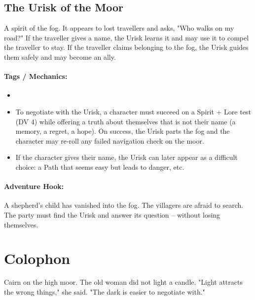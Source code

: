 \subsection*{The Urisk of the Moor}

A spirit of the fog. It appears to lost travellers and asks, "Who walks on my road?" If the traveller gives a name, the Urisk learns it and may use it to compel the traveller to stay. If the traveller claims belonging to the fog, the Urisk guides them safely and may become an ally.

\paragraph{Tags / Mechanics:}
\begin{itemize}
\item [SPIRIT] [THRESHOLD]
\item To negotiate with the Urisk, a character must succeed on a Spirit + Lore test (DV 4) while offering a truth about themselves that is not their name (a memory, a regret, a hope). On success, the Urisk parts the fog and the character may re‑roll any failed navigation check on the moor.
\item If the character gives their name, the Urisk can later appear as a difficult choice: a Path that seems easy but leads to danger, etc.
\end{itemize}

\paragraph{Adventure Hook:}
A shepherd's child has vanished into the fog. The villagers are afraid to search. The party must find the Urisk and answer its question -- without losing themselves.

\section*{Colophon}
Cairn on the high moor. The old woman did not light a candle. "Light attracts the wrong things," she said. "The dark is easier to negotiate with."

